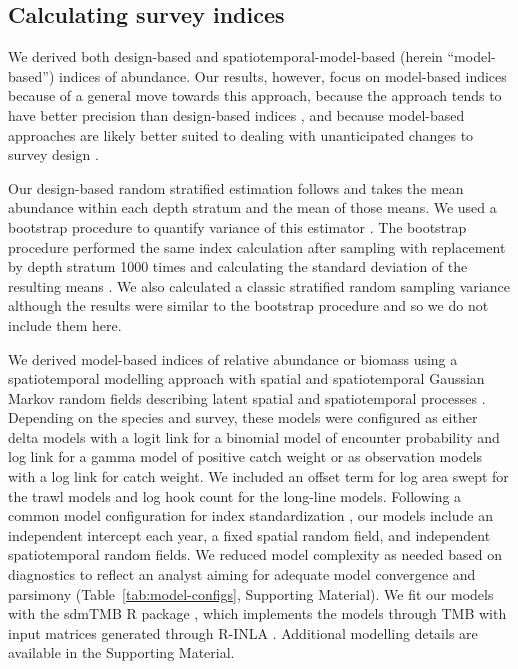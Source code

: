\documentclass[12pt]{article}
\begin{document}
\subsection*{Calculating survey indices}

We derived both design-based and spatiotemporal-model-based (herein ``model-based'') indices of abundance.
Our results, however, focus on model-based indices because of a general move towards this approach, because the approach tends to have better precision than design-based indices \citep{shelton2014, thorson2015a}, and because model-based approaches are likely better suited to dealing with unanticipated changes to survey design \citep{ices2023}.

Our design-based random stratified estimation follows \citet[][p.~91]{cochran1977} and takes the mean abundance within each depth stratum and the mean of those means.
We used a bootstrap procedure to quantify variance of this estimator \citep{schnute2000}.
The bootstrap procedure performed the same index calculation after sampling with replacement by depth stratum 1000 times and calculating the standard deviation of the resulting means \citep{schnute2000}.
We also calculated a classic stratified random sampling variance \citep[][p.~95]{cochran1977} although the results were similar to the bootstrap procedure and so we do not include them here.

We derived model-based indices of relative abundance or biomass using a spatiotemporal modelling approach with spatial and spatiotemporal Gaussian Markov random fields describing latent spatial and spatiotemporal processes \citep[e.g.,][]{shelton2014, thorson2015a, anderson2022}.
Depending on the species and survey, these models were configured as either delta models \citep{aitchison1955} with a logit link for a binomial model of encounter probability  and log link for a gamma model of positive catch weight \citep{schnute2003} or as \citet{tweedie1984} observation models with a log link for catch weight.
We included an offset term \citep[][p.~206]{mccullagh1989} for log area swept for the trawl models and log hook count for the long-line models.
Following a common model configuration for index standardization \citep[e.g.,][]{thorson2015a, thorson2019a}, our models include an independent intercept each year, a fixed spatial random field, and independent spatiotemporal random fields.
We reduced model complexity as needed based on diagnostics to reflect an analyst aiming for adequate model convergence and parsimony (Table~\ref{tab:model-configs}, Supporting Material).
We fit our models with the sdmTMB \textsf{R} package \citep{anderson2022}, which implements the models through TMB \citep{kristensen2016} with input matrices generated through \textsf{R}-INLA \citep{lindgren2015}.
Additional modelling details are available in the Supporting Material.
\end{document}
